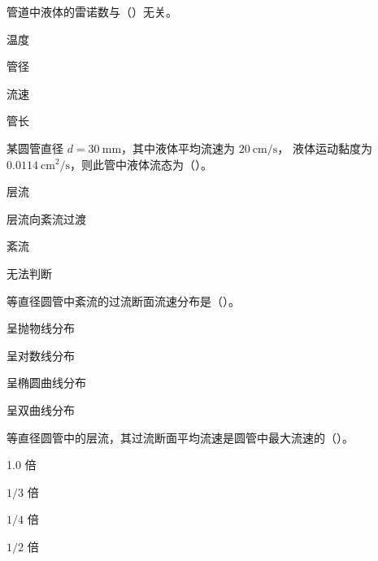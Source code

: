 \begin{ti}

\item[4-1] 管道中液体的雷诺数与（\quad）无关。
\begin{choices}
\item 温度
\item 管径
\item 流速
\item 管长
\end{choices}

\item[4-2] 某圆管直径 $d=30\ \mathrm{mm}$，其中液体平均流速为 $20\ \mathrm{cm/s}$，
液体运动黏度为 $0.0114\ \mathrm{cm^2/s}$，则此管中液体流态为（\quad）。
\begin{choices}
\item 层流
\item 层流向紊流过渡
\item 紊流
\item 无法判断
\end{choices}

\item[4-3] 等直径圆管中紊流的过流断面流速分布是（\quad）。
\begin{choices}
\item 呈抛物线分布
\item 呈对数线分布
\item 呈椭圆曲线分布
\item 呈双曲线分布
\end{choices}

\item[4-4] 等直径圆管中的层流，其过流断面平均流速是圆管中最大流速的（\quad）。
\begin{choices}
\item 1.0 倍
\item $1/3$ 倍
\item $1/4$ 倍
\item $1/2$ 倍
\end{choices}


\end{ti}
